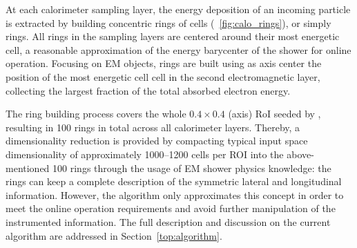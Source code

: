 At each calorimeter sampling layer, the energy deposition of an incoming particle is extracted by building concentric rings of cells (\figurename~\ref{fig:calo_rings}), or simply rings. All rings in the \ecal sampling layers are
centered around their most energetic cell, a reasonable
approximation of the energy barycenter of the shower for online
operation. Focusing on EM objects, rings are built using as axis center the position of the most energetic cell cell in the second electromagnetic layer, collecting the largest fraction of the total absorbed electron energy.

The ring building process covers the whole $0.4\times0.4$ (\etaphi axis) RoI
seeded by \licalo, resulting in 100 rings in total across all calorimeter layers.
Thereby, a dimensionality reduction is provided by compacting
typical input space dimensionality of approximately 1000--1200 cells per ROI into
the above-mentioned 100 rings through the usage of EM shower physics knowledge: the rings can keep a complete description of the symmetric lateral and
longitudinal information. However, the algorithm only approximates this concept
in order to meet the online operation requirements and avoid further
manipulation of the instrumented information. The full description and
discussion on the current algorithm are addressed in
Section~\ref{top:algorithm}.



